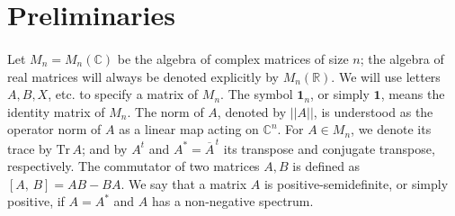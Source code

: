 \documentclass[12pt]{article}
\theoremstyle{plain}
\theoremstyle{definition}
\theoremstyle{remark}
\numberwithin{equation}{section}
\begin{document}
\section{Preliminaries}
\label{sec:Preliminaries}

\paragraph{}
Let
$M_{n} = M_{n}(\mathbb{C})$ be the algebra of complex matrices
of size $n$;
the algebra of real matrices will always be denoted explicitly by
$M_{n}(\mathbb{R})$.
We will use letters $A, B, X$, etc. to specify a matrix of $M_{n}$.
The symbol $\mathbf{1}_{n}$, or simply $\mathbf{1}$,
means the identity matrix of $M_{n}$.
The norm of $A$, denoted by $||A||$, is understood as the operator
norm of $A$ as a linear map acting on $\mathbb{C}^{n}$.
For $A \in M_{n}$,
we denote its trace by $\text{Tr} \, A$;
and by $A^{t}$ and $A^{*} = \overline{A}^{\,t}$
its transpose and conjugate transpose, respectively.
The commutator of two matrices $A, B$ is defined as
$[A, \, B] = AB - BA$.
We say that a matrix $A$ is positive-semidefinite,
or simply positive,
if $A = A^{*}$ and $A$ has a non-negative spectrum.
\end{document}
